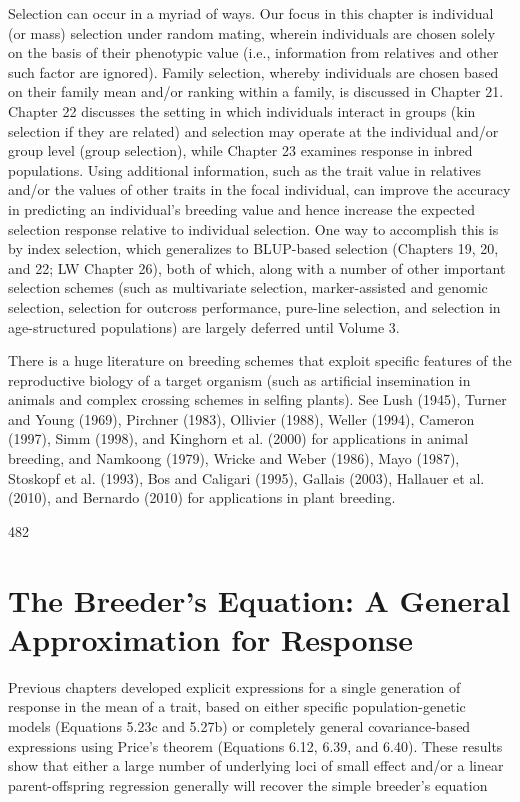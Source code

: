 \documentclass{article}
\begin{document}
Selection can occur in a myriad of ways. Our focus in this chapter is individual (or mass) selection under random mating, wherein individuals are chosen solely on the basis of their phenotypic value (i.e., information from relatives and other such factor are ignored). Family selection, whereby individuals are chosen based on their family mean and/or ranking within a family, is discussed in Chapter 21. Chapter 22 discusses the setting in which individuals interact in groups (kin selection if they are related) and selection may operate at the individual and/or group level (group selection), while Chapter 23 examines response in inbred populations. Using additional information, such as the trait value in relatives and/or the values of other traits in the focal individual, can improve the accuracy in predicting an individual's breeding value and hence increase the expected selection response relative to individual selection. One way to accomplish this is by index selection, which generalizes to BLUP-based selection (Chapters 19, 20, and 22; LW Chapter 26), both of which, along with a number of other important selection schemes (such as multivariate selection, marker-assisted and genomic selection, selection for outcross performance, pure-line selection, and selection in age-structured populations) are largely deferred until Volume 3.

There is a huge literature on breeding schemes that exploit specific features of the reproductive biology of a target organism (such as artificial insemination in animals and complex crossing schemes in selfing plants). See Lush (1945), Turner and Young (1969), Pirchner (1983), Ollivier (1988), Weller (1994), Cameron (1997), Simm (1998), and Kinghorn et al. (2000) for applications in animal breeding, and Namkoong (1979), Wricke and Weber (1986), Mayo (1987), Stoskopf et al. (1993), Bos and Caligari (1995), Gallais (2003), Hallauer et al. (2010), and Bernardo (2010) for applications in plant breeding.

482

\section{The Breeder's Equation: A General Approximation for Response}
Previous chapters developed explicit expressions for a single generation of response in the mean of a trait, based on either specific population-genetic models (Equations 5.23c and 5.27b) or completely general covariance-based expressions using Price's theorem (Equations 6.12, 6.39, and 6.40). These results show that either a large number of underlying loci of small effect and/or a linear parent-offspring regression generally will recover the simple breeder's equation
\end{document}

